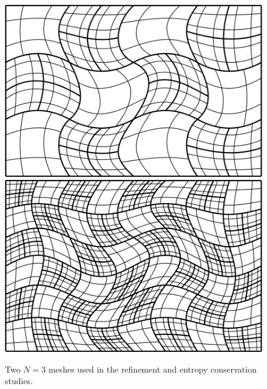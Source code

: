 \documentclass{svjour3}                     %
\begin{document}
\begin{figure}
\centering
\includegraphics[width=.475\textwidth]{figs/mesh_curved0.png}
\hspace{.5em}
\includegraphics[width=.475\textwidth]{figs/mesh_curved.png}
\caption{Two $N=3$ meshes used in the refinement and entropy conservation studies.}
\end{figure}
\end{document}
